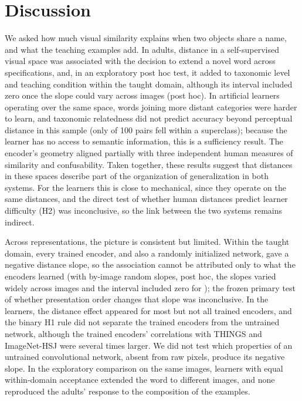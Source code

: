 \documentclass[11pt]{article}
\begin{document}
\section{Discussion}


We asked how much visual similarity explains when two objects share a name, and what the teaching examples add. In adults, distance in a self-supervised visual space was associated with the decision to extend a novel word across specifications, and, in an exploratory post hoc test, it added to taxonomic level and teaching condition within the taught domain, although its interval included zero once the slope could vary across images (post hoc). In artificial learners operating over the same space, words joining more distant categories were harder to learn, and taxonomic relatedness did not predict accuracy beyond perceptual distance in this sample (only \NWithin{} of 100 pairs fell within a superclass); because the learner has no access to semantic information, this is a sufficiency result. The encoder's geometry aligned partially with three independent human measures of similarity and confusability. Taken together, these results suggest that distances in these spaces describe part of the organization of generalization in both systems. For the learners this is close to mechanical, since they operate on the same distances, and the direct test of whether human distances predict learner difficulty (H2) was inconclusive, so the link between the two systems remains indirect.

Across representations, the picture is consistent but limited. Within the taught domain, every trained encoder, and also a randomly initialized network, gave a negative distance slope, so the association cannot be attributed only to what the encoders learned (with by-image random slopes, post hoc, the slopes varied widely across images and the interval included zero for \VcImgTrInclList); the frozen primary test of whether presentation order changes that slope was inconclusive. In the learners, the distance effect appeared for most but not all trained encoders, and the binary H1 rule did not separate the trained encoders from the untrained network, although the trained encoders' correlations with THINGS and ImageNet-HSJ were several times larger. We did not test which properties of an untrained convolutional network, absent from raw pixels, produce its negative slope. In the exploratory comparison on the same images, learners with equal within-domain acceptance extended the word to different images, and none reproduced the adults' response to the composition of the examples.
\end{document}
